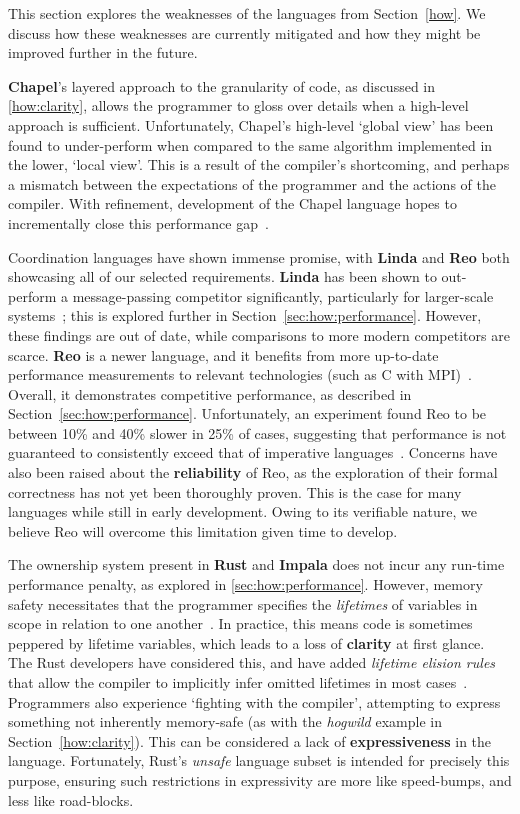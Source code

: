 This section explores the weaknesses of the languages from Section~\ref{how}. We discuss how these weaknesses are currently mitigated and how they might be improved further in the future.


\textbf{Chapel}'s layered approach to the granularity of code, as discussed in \ref{how:clarity}, allows the programmer to gloss over details when a high-level approach is sufficient. Unfortunately, Chapel's high-level `global view' has been found to under-perform when compared to the same algorithm implemented in the lower, `local view'. This is a result of the compiler's shortcoming, and perhaps a mismatch between the expectations of the programmer and the actions of the compiler. With refinement, development of the Chapel language hopes to incrementally close this performance gap~\cite{chapel,globalViewChaphel}.


Coordination languages have shown immense promise, with \textbf{Linda} and \textbf{Reo} both showcasing all of our selected requirements. \textbf{Linda} has been shown to out-perform a message-passing competitor significantly, particularly for larger-scale systems~\cite{LindaVSMessage}; this is explored further in Section~\ref{sec:how:performance}. However, these findings are out of date, while comparisons to more modern competitors are scarce. \textbf{Reo} is a newer language, and it benefits from more up-to-date performance measurements to relevant technologies (such as C with MPI)~\cite{proper}. Overall, it demonstrates competitive performance, as described in Section~\ref{sec:how:performance}. Unfortunately, an experiment found Reo to be between 10\% and 40\% slower in 25\% of cases, suggesting that performance is not guaranteed to consistently exceed that of imperative languages~\cite{proper}. Concerns have also been raised about the \textbf{reliability} of Reo, as the exploration of their formal correctness has not yet been thoroughly proven. This is the case for many languages while still in early development. Owing to its verifiable nature, we believe Reo will overcome this limitation given time to develop.

The ownership system present in \textbf{Rust} and \textbf{Impala} does not incur any run-time performance penalty, as explored in 
\ref{sec:how:performance}. However, memory safety necessitates that the programmer specifies the \textit{lifetimes} of variables in scope in relation to one another~\cite{rustSystem}. In practice, this means code is sometimes peppered by lifetime variables, which leads to a loss of \textbf{clarity} at first glance. The Rust developers have considered this, and have added \textit{lifetime elision rules} that allow the compiler to implicitly infer omitted lifetimes in most cases~\cite{rustlang}. Programmers also experience `fighting with the compiler', attempting to express something not inherently memory-safe (as with the \textit{hogwild} example in Section~\ref{how:clarity}). This can be considered a lack of \textbf{expressiveness} in the language. Fortunately, Rust's \textit{unsafe} language subset is intended for precisely this purpose, ensuring such restrictions in expressivity are more like speed-bumps, and less like road-blocks.

